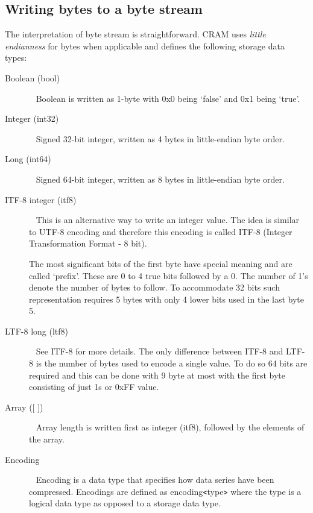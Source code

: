 \documentclass[a4paper]{article}
\begin{document}
\subsection{\textbf{Writing bytes to a byte stream}}
\label{subsec:writing-bytes}

The interpretation of byte stream is straightforward. CRAM uses \emph{little endianness}
for bytes when applicable and defines the following storage data types:

\begin{description}

\item[Boolean (bool)]\ \newline
Boolean is written as 1-byte with 0x0 being `false' and 0x1 being `true'.

\item[Integer (int32)]\ \newline
Signed 32-bit integer, written as 4 bytes in little-endian byte order.

\item[Long (int64)]\ \newline
Signed 64-bit integer, written as 8 bytes in little-endian byte order.

\item[ITF-8 integer (itf8)]\ \newline
This is an alternative way to write an integer value. The idea is similar to UTF-8 
encoding and therefore this encoding is called ITF-8 (Integer Transformation Format 
- 8 bit). 

The most significant bits of the first byte have special meaning and are called 
`prefix'. These are 0 to 4 true bits followed by a 0. The number of 1's denote 
the number of bytes to follow. To accommodate 32 bits such representation requires 
5 bytes with only 4 lower bits used in the last byte 5.

\item[LTF-8 long (ltf8)]\ \newline
See ITF-8 for more details. The only difference between ITF-8 and LTF-8 is the 
number of bytes used to encode a single value. To do so 64 bits are required and 
this can be done with 9 byte at most with the first byte consisting of just 1s 
or 0xFF value. 

\item[{Array ([ ])}]\ \newline
Array length is written first as integer (itf8), followed by the elements of the 
array. 

\item[{Encoding}]\ \newline
Encoding is a data type that specifies how data series have been compressed. Encodings 
are defined as encoding\texttt{<}type\texttt{>} where the type is a logical data 
type as opposed to a storage data type.


\end{description}
\end{document}
